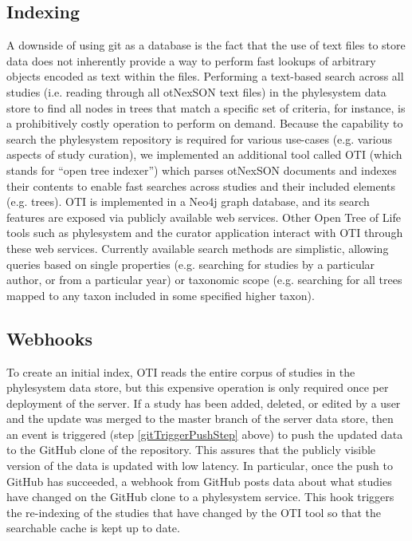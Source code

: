 \documentclass{bioinfo}
\newcommand{\ps}{phylesystem\xspace}
\newcommand{\otol}{Open Tree of Life\xspace}
\newcommand{\nexson}{otNexSON\xspace}
\begin{document}
\begin{methods}
\subsection*{Indexing}
A downside of using git as a database is the fact that the use of text files to store data does not inherently
    provide a way to perform fast lookups of arbitrary objects encoded as text within the files.
Performing a text-based search across all studies (i.e. reading through all \nexson text files) in the \ps data store to find all nodes
    in trees that match a specific set of criteria, for instance, is a prohibitively costly operation to perform on demand.
Because the capability to search the \ps repository is required for various use-cases (e.g. various aspects of
    study curation), we implemented an additional tool called OTI (which stands for ``open tree indexer'') which parses \nexson
    documents and indexes their contents to enable fast searches across studies and their included elements (e.g. trees).
OTI is implemented in a Neo4j graph database, and its search features are exposed via publicly available web services.
Other \otol tools such as \ps and the curator application interact with OTI through these web services.
Currently available search methods are simplistic, allowing queries based on single properties (e.g. searching for studies
    by a particular author, or from a particular year) or taxonomic scope (e.g. searching for all trees mapped to
    any taxon included in some specified higher taxon).


\subsection*{Webhooks}
To create an initial index, OTI reads the entire corpus of studies in the \ps data store, but this expensive operation
    is only required once per deployment of the server.
If a study has been added, deleted, or edited by a user and the update was merged to the master branch of the server data store,
    then an event is triggered (step \ref{gitTriggerPushStep} above) to push the updated data to the GitHub clone
    of the repository.
This assures that the publicly visible version of the data is updated
    with low latency.
In particular, once the push to GitHub has succeeded, a webhook from GitHub posts data about what studies have changed
    on the GitHub clone to a \ps service.
This hook triggers the re-indexing of the studies that have changed by the OTI tool so that the searchable cache is
    kept up to date.


\end{methods}
\end{document}
